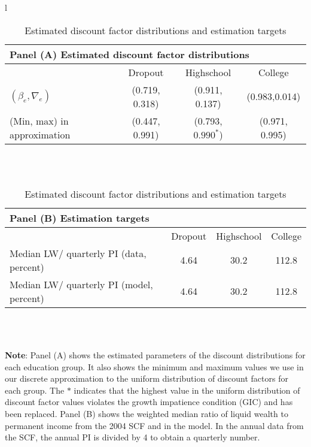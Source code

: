 \documentclass[\econtexRoot/HAFiscal]{subfiles}
\begin{document}
\begin{table}[th]
  \begin{center}
    \begin{tabular}{l}
      \begin{tabular}{lccc}
        \multicolumn{4}{l}{Panel (A) Estimated discount factor distributions} \\ \midrule
        & Dropout & Highschool & College \\ \midrule
        $(\beta_e, \nabla_e)$ & (0.719, 0.318) & (0.911, 0.137) & (0.983,0.014) \\
        (Min, max) in approximation & (0.447, 0.991) & (0.793, $0.990^*$) & (0.971, 0.995) \\
        \midrule 
      \end{tabular} \\ \\ 
      
      \begin{tabular}{lccc}
        \multicolumn{4}{l}{Panel (B) Estimation targets} \\ \midrule
        & Dropout & Highschool & College \\ \midrule
        Median LW/ quarterly PI (data, percent) & 4.64 & 30.2 & 112.8 \\ 
        Median LW/ quarterly PI (model, percent) & 4.64 & 30.2 & 112.8 %
        \\ \midrule 
      \end{tabular} \\ \\ 
    \end{tabular}
    \caption{Estimated discount factor distributions and estimation targets}
    \notinsubfile{\label{tab:estimBetas}}
    \parbox{16cm}{\small \vspace{.15cm} \textbf{Note}: Panel (A) shows the estimated parameters of the discount distributions for each education group. It also shows the minimum and maximum values we use in our discrete approximation to the uniform distribution of discount factors for each group. The $*$ indicates that the highest value in the uniform distribution of discount factor values violates the growth impatience condition (GIC) and has been replaced. Panel (B) shows the weighted median ratio of liquid wealth to permanent income from the 2004 SCF and in the model. In the annual data from the SCF, the annual PI is divided by 4 to obtain a quarterly number.\normalsize}
  \end{center}
\end{table}
\end{document}
